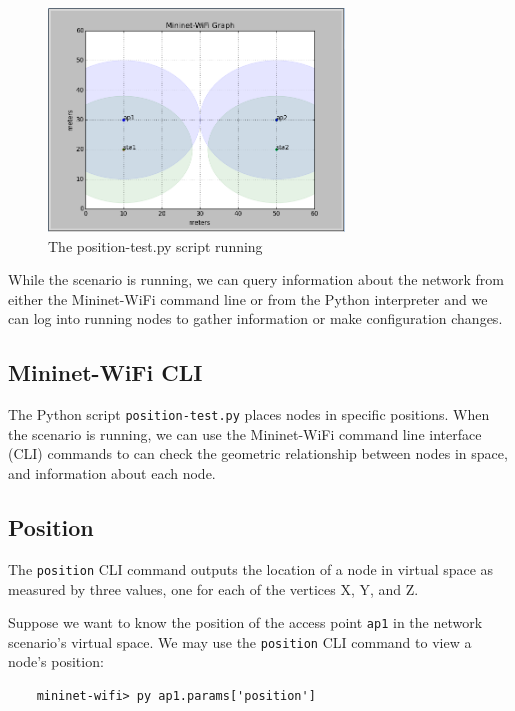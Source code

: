\begin{figure}
    \centering
    \includegraphics[width=0.7\textwidth]{Pictures/mn-wifi-graph-300.png}
    \caption{The position-test.py script running}
    \label{fig:scriptrunning}
\end{figure}

While the scenario is running, we can query information about the network from either the Mininet-WiFi command line or from the Python interpreter and we can log into running nodes to gather information or make configuration changes.

\subsection{Mininet-WiFi CLI}

The Python script \texttt{position-test.py} places nodes in specific positions. When the scenario is running, we can use the Mininet-WiFi command line interface (CLI) commands to can check the geometric relationship between nodes in space, and information about each node.

\subsection{Position}

The \texttt{position} CLI command outputs the location of a node in virtual space as measured by three values, one for each of the vertices X, Y, and Z.

Suppose we want to know the position of the access point \texttt{ap1} in the network scenario's virtual space. We may use the \texttt{position} CLI command to view a node's position:

\begin{verbatim}
    mininet-wifi> py ap1.params['position']
\end{verbatim}
   

